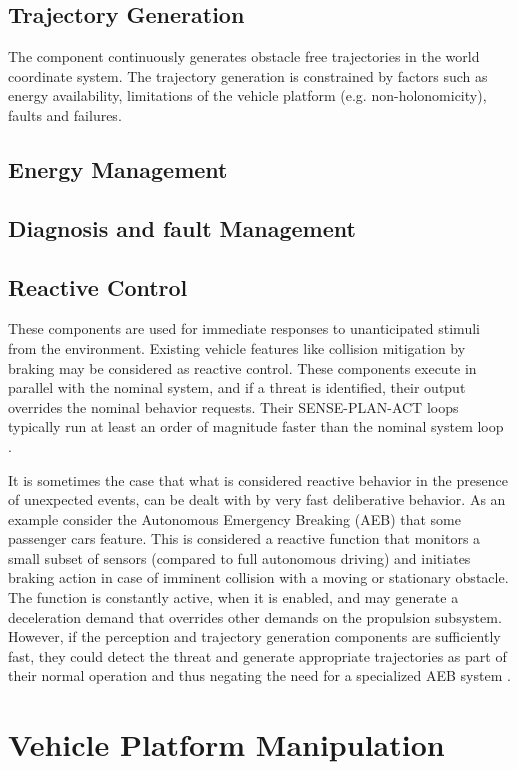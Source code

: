 \subsection{Trajectory Generation}
The component continuously generates obstacle free trajectories in the world coordinate system. The trajectory generation is constrained by factors such as energy availability, limitations of the vehicle platform (e.g. non-holonomicity), faults and failures. 

\subsection{Energy Management}

\subsection{Diagnosis and fault Management}

\subsection{Reactive Control}
These components are used for immediate responses to unanticipated stimuli from the environment. Existing vehicle features like collision mitigation  by braking may be considered as reactive control. These components execute in parallel with the nominal system, and if a threat is identified, their output overrides the nominal behavior requests. Their SENSE-PLAN-ACT loops typically run at least an order of magnitude faster than the  nominal system loop \cite{Bahere}.

It is sometimes the case that what is considered reactive behavior in the presence of unexpected events, can be dealt with by very fast deliberative behavior. As an example consider the Autonomous Emergency Breaking (AEB) that some passenger cars feature. This is considered a reactive function that monitors a small subset of sensors
(compared to full autonomous driving) and initiates braking action in case of imminent collision with a moving or stationary obstacle. The function is constantly active, when it is enabled, and may generate a deceleration demand that overrides other demands on the propulsion subsystem. However, if the perception and trajectory generation components are sufficiently fast, they could detect the threat and generate appropriate trajectories as part of their normal operation and thus negating the need for a specialized AEB system \cite{Bahere}.  

\section{Vehicle Platform Manipulation}

